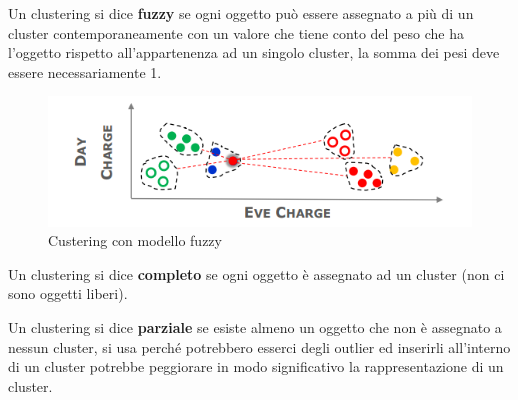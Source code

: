 \begin{defn}
	Un clustering si dice \textbf{fuzzy} se ogni oggetto può essere assegnato a più di un cluster contemporaneamente con un valore che tiene conto del peso che ha l'oggetto rispetto all'appartenenza ad un singolo cluster, la somma dei pesi deve essere necessariamente 1.
\end{defn}
\begin{figure}[H]
	\centering
	\includegraphics[height=0.3 \linewidth]{clustering/pict/fuzzy.png}
	\caption{Custering con modello fuzzy}
\end{figure}
\begin{defn}
	Un clustering si dice \textbf{completo} se ogni oggetto è assegnato ad un cluster (non ci sono oggetti liberi).
\end{defn}

\begin{defn}
	Un clustering si dice \textbf{parziale} se esiste almeno un oggetto che non è assegnato a nessun cluster, si usa perché potrebbero esserci degli outlier ed inserirli all'interno di un cluster potrebbe peggiorare in modo significativo la rappresentazione di un cluster.
\end{defn}

